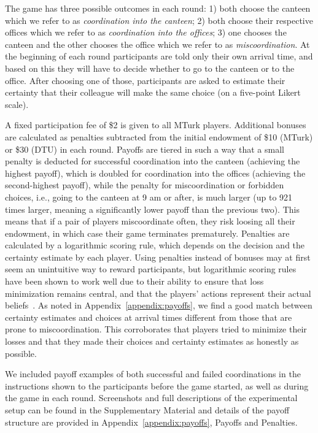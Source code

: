 \documentclass[twocolumn,a4paper,superscriptaddress,nofootinbib]{revtex4}
\newcommand{\tobo}[1]{{\color{red} TOBO: #1}}
\begin{document}
The game has three possible outcomes in each round: 1) both choose the canteen which we refer to as \emph{coordination into the canteen}; 2) both choose their respective offices which we refer to as \emph{coordination into the offices}; 3) one chooses the canteen and the other chooses the office which we refer to as \emph{miscoordination}. At the beginning of each round participants are told only their own arrival time, and based on this they will have to decide whether to go to the canteen or to the office. After choosing one of those, participants are asked to estimate their certainty that their colleague will make the same choice (on a five-point Likert scale). 

A fixed participation fee of \$2 is given to all MTurk players. Additional bonuses are calculated as penalties subtracted from the initial endowment of \$10 (MTurk) or \$30 (DTU) in each round. Payoffs are tiered in such a way that a small penalty is deducted for successful coordination into the canteen (achieving the highest payoff), which is doubled for coordination into the offices (achieving the second-highest payoff), while the penalty for miscoordination or forbidden choices, i.e., going to the canteen at 9 am or after, is much larger (up to 921 times larger, meaning a significantly lower payoff than the previous two). This means that if a pair of players miscoordinate often, they risk loosing all their endowment, in which case their game terminates prematurely. Penalties are calculated by a logarithmic scoring rule, which depends on the decision and the certainty estimate by each player. Using penalties instead of bonuses may at first seem an unintuitive way to reward participants, but logarithmic scoring rules have been shown to work well due to their ability to ensure that loss minimization remains central, and that the players' actions represent their actual beliefs~\citep{good1992rational, seidenfeld1985calibration, palfrey2009eliciting, mccutcheon2019favor}. %
As noted in Appendix~\ref{appendix:payoffs}, we find a good match between certainty estimates and choices at arrival times different from those that are prone to miscoordination. This corroborates that players tried to minimize their losses and that they made their choices and certainty estimates as honestly as possible. 

We included payoff examples of both successful and failed coordinations in the instructions shown to the participants before the game started, as well as during the game in each round. Screenshots and full descriptions of the experimental setup can be found in the Supplementary Material and details of the payoff structure are provided in Appendix~\ref{appendix:payoffs}, Payoffs and Penalties.
\end{document}
